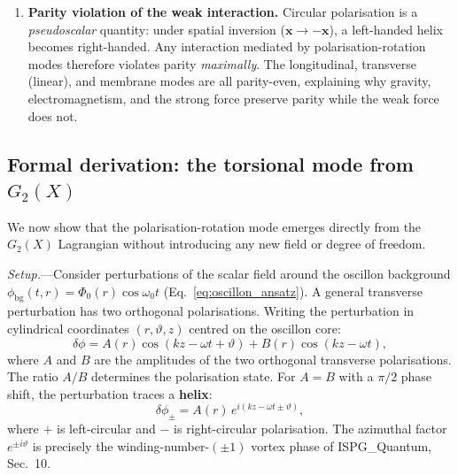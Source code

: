 \documentclass[11pt]{article}
\begin{document}
\begin{enumerate}
  \item \textbf{Parity violation of the weak
    interaction.}\;
    Circular polarisation is a \emph{pseudoscalar}
    quantity: under spatial inversion
    ($\mathbf{x} \to -\mathbf{x}$), a left-handed
    helix becomes right-handed.  Any interaction
    mediated by polarisation-rotation modes
    therefore violates parity \emph{maximally}.
    The longitudinal, transverse (linear), and
    membrane modes are all parity-even, explaining
    why gravity, electromagnetism, and the strong
    force preserve parity while the weak force
    does not.
\end{enumerate}

\subsection{Formal derivation: the torsional mode
from $G_2(X)$}
\label{sec:torsion_derivation}

We now show that the polarisation-rotation mode
emerges directly from the $G_2(X)$ Lagrangian
without introducing any new field or degree of
freedom.

\textit{Setup.}---Consider perturbations of the
scalar field around the oscillon background
$\phi_{\mathrm{bg}}(t,r) = \Phi_0(r)\cos\omega_0 t$
(Eq.~\ref{eq:oscillon_ansatz}).  A general
transverse perturbation has two orthogonal
polarisations.  Writing the perturbation in
cylindrical coordinates $(r, \vartheta, z)$
centred on the oscillon core:
\begin{equation}\label{eq:helical_ansatz}
  \delta\phi
  = A(r)\cos(kz - \omega t + \vartheta)
  + B(r)\cos(kz - \omega t),
\end{equation}
where $A$ and $B$ are the amplitudes of the two
orthogonal transverse polarisations.  The ratio
$A/B$ determines the polarisation state.  For
$A = B$ with a $\pi/2$ phase shift, the
perturbation traces a \textbf{helix}:
\begin{equation}\label{eq:circular_pol}
  \delta\phi_{\pm}
  = A(r)\,e^{i(kz - \omega t \pm \vartheta)},
\end{equation}
where $+$ is left-circular and $-$ is
right-circular polarisation.  The azimuthal
factor $e^{\pm i\vartheta}$ is precisely the
winding-number-$(\pm 1)$ vortex phase of
ISPG\_Quantum, Sec.~10.
\end{document}
